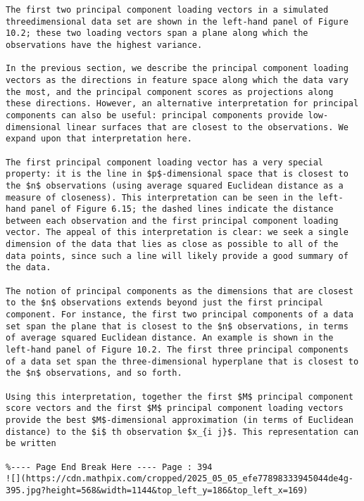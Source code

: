 \documentclass[10pt]{article}
\begin{document}
\begin{verbatim}
The first two principal component loading vectors in a simulated threedimensional data set are shown in the left-hand panel of Figure 10.2; these two loading vectors span a plane along which the observations have the highest variance.

In the previous section, we describe the principal component loading vectors as the directions in feature space along which the data vary the most, and the principal component scores as projections along these directions. However, an alternative interpretation for principal components can also be useful: principal components provide low-dimensional linear surfaces that are closest to the observations. We expand upon that interpretation here.

The first principal component loading vector has a very special property: it is the line in $p$-dimensional space that is closest to the $n$ observations (using average squared Euclidean distance as a measure of closeness). This interpretation can be seen in the left-hand panel of Figure 6.15; the dashed lines indicate the distance between each observation and the first principal component loading vector. The appeal of this interpretation is clear: we seek a single dimension of the data that lies as close as possible to all of the data points, since such a line will likely provide a good summary of the data.

The notion of principal components as the dimensions that are closest to the $n$ observations extends beyond just the first principal component. For instance, the first two principal components of a data set span the plane that is closest to the $n$ observations, in terms of average squared Euclidean distance. An example is shown in the left-hand panel of Figure 10.2. The first three principal components of a data set span the three-dimensional hyperplane that is closest to the $n$ observations, and so forth.

Using this interpretation, together the first $M$ principal component score vectors and the first $M$ principal component loading vectors provide the best $M$-dimensional approximation (in terms of Euclidean distance) to the $i$ th observation $x_{i j}$. This representation can be written

%---- Page End Break Here ---- Page : 394
![](https://cdn.mathpix.com/cropped/2025_05_05_efe77898333945044de4g-395.jpg?height=568&width=1144&top_left_y=186&top_left_x=169)


\end{verbatim}
\end{document}
